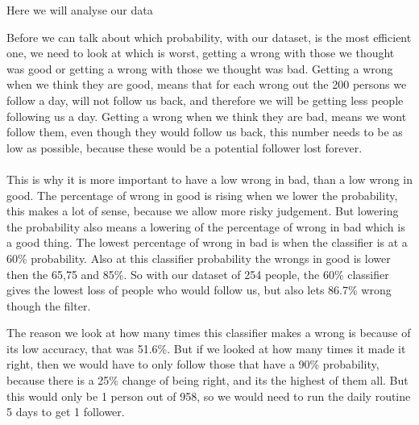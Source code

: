 Here we will analyse our data

Before we can talk about which probability, with our dataset, is the most efficient one, we need to look at which is worst, getting a wrong with those we thought was good or getting a wrong with those we thought was bad. Getting a wrong when we think they are good, means that for each wrong out the 200 persons we follow a day, will not follow us back, and therefore we will be getting less people following us a day. Getting a wrong when we think they are bad, means we wont follow them, even though they would follow us back, this number needs to be as low as possible, because these would be a potential follower lost forever.\\
\\
This is why it is more important to have a low wrong in bad, than a low wrong in good. The percentage of wrong in good is rising when we lower the probability, this makes a lot of sense, because we allow more risky judgement. But lowering the probability also means a lowering of the percentage of wrong in bad which is a good thing. The lowest percentage of wrong in bad is when the classifier is at a 60\% probability. Also at this classifier probability the wrongs in good is lower then the  65,75 and 85\%. So with our dataset of 254 people, the 60\% classifier gives the lowest loss of people who would follow us, but also lets 86.7\% wrong though the filter.

The reason we look at how many times this classifier makes a wrong is because of its low accuracy, that was 51.6\%. But if we looked at how many times it made it right, then we would have to only follow those that have a 90\% probability, because there is a 25\% change of being right, and its the highest of them all. But this would only be 1 person out of 958, so we would need to run the daily routine 5 days to get 1 follower.